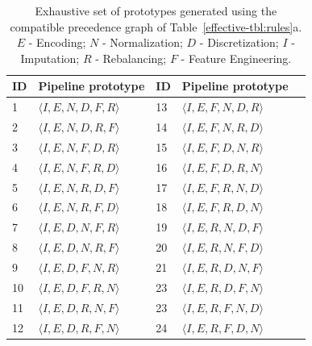 \begin{table}[t]
\caption[Enumeration of the prototypes that can be generated by compatible precedence]{Exhaustive set of prototypes generated using the compatible precedence graph of Table~\ref{effective-tbl:rules}a. $E$ - Encoding; $N$ - Normalization; $D$ - Discretization; $I$ - Imputation; $R$ - Rebalancing; $F$ - Feature Engineering.
}
\footnotesize
\label{effective-tbl:pipeline-enumeration}
\begin{center}
\begin{tabular}{@{}lllll@{}}
\toprule
ID & Pipeline prototype & ID & Pipeline prototype                                                                   \\ \toprule
1  & {\color[HTML]{000000} $\langle I, E, N, D, F, R \rangle$} & 13 & {\color[HTML]{000000} $\langle I, E, F, N, D, R \rangle$} \\
2  & {\color[HTML]{000000} $\langle I, E, N, D, R, F \rangle$} & 14 & {\color[HTML]{000000} $\langle I, E, F, N, R, D \rangle$} \\
3  & {\color[HTML]{000000} $\langle I, E, N, F, D, R \rangle$} & 15 & {\color[HTML]{000000} $\langle I, E, F, D, N, R \rangle$} \\
4  & {\color[HTML]{000000} $\langle I, E, N, F, R, D \rangle$} & 16 & {\color[HTML]{000000} $\langle I, E, F, D, R, N \rangle$} \\
5  & {\color[HTML]{000000} $\langle I, E, N, R, D, F \rangle$} & 17 & {\color[HTML]{000000} $\langle I, E, F, R, N, D \rangle$} \\
6  & {\color[HTML]{000000} $\langle I, E, N, R, F, D \rangle$} & 18 & {\color[HTML]{000000} $\langle I, E, F, R, D, N \rangle$} \\
7  & {\color[HTML]{000000} $\langle I, E, D, N, F, R \rangle$} & 19 & {\color[HTML]{000000} $\langle I, E, R, N, D, F \rangle$} \\
8  & {\color[HTML]{000000} $\langle I, E, D, N, R, F \rangle$} & 20 & {\color[HTML]{000000} $\langle I, E, R, N, F, D \rangle$} \\
9  & {\color[HTML]{000000} $\langle I, E, D, F, N, R \rangle$} & 21 & {\color[HTML]{000000} $\langle I, E, R, D, N, F \rangle$} \\
10 & {\color[HTML]{000000} $\langle I, E, D, F, R, N \rangle$} & 23 & {\color[HTML]{000000} $\langle I, E, R, D, F, N \rangle$} \\
11 & {\color[HTML]{000000} $\langle I, E, D, R, N, F \rangle$} & 23 & {\color[HTML]{000000} $\langle I, E, R, F, N, D \rangle$} \\
12 & {\color[HTML]{000000} $\langle I, E, D, R, F, N \rangle$} & 24 & {\color[HTML]{000000} $\langle I, E, R, F, D, N \rangle$}
\\ \bottomrule
\end{tabular}
\end{center}
\end{table}

